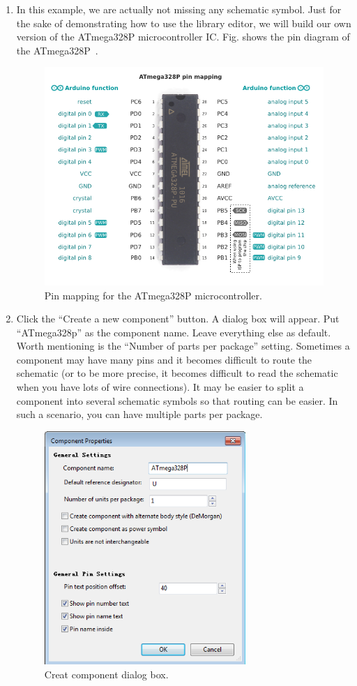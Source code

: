 \documentclass[12pt,letterpaper]{scrartcl}
\begin{document}
\begin{enumerate}
	\item In this example, we are actually not missing any schematic symbol. Just for the sake of demonstrating how to use the library editor, we will build our own version of the ATmega328P microcontroller IC. Fig. shows the pin diagram of the ATmega328P~\cite{atmega328p}.
		\begin{figure}[hp]
			\centering
			\includegraphics[width=5in]{atmega328p-pins}
			\caption{Pin mapping for the ATmega328P microcontroller.}
			\label{fig:atmega328p-pins}
		\end{figure}

	\item Click the ``Create a new component'' button. A dialog box will appear. Put \nohyphens{``ATmega328p''} as the component name. Leave everything else as default. Worth mentioning is the ``Number of parts per package'' setting. Sometimes a component may have many pins and it becomes difficult to route the schematic (or to be more precise, it becomes difficult to read the schematic when you have lots of wire connections). It may be easier to split a component into several schematic symbols so that routing can be easier. In such a scenario, you can have multiple parts per package. 
		\begin{figure}[hp]
			\centering
			\includegraphics[width=3in]{create-component}
			\caption{Creat component dialog box.}
			\label{fig:create-component}
		\end{figure}
		

\end{enumerate}
\end{document}
